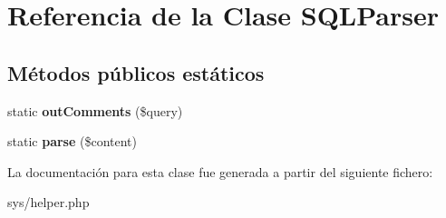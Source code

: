 \hypertarget{class_s_q_l_parser}{}\section{Referencia de la Clase S\+Q\+L\+Parser}
\label{class_s_q_l_parser}
\subsection*{Métodos públicos estáticos}
\begin{DoxyCompactItemize}
\item 
\hypertarget{class_s_q_l_parser_acb297d08abcd4ac4fabe1fbe54042e3d}{}static {\bfseries out\+Comments} (\$query)\label{class_s_q_l_parser_acb297d08abcd4ac4fabe1fbe54042e3d}

\item 
\hypertarget{class_s_q_l_parser_a6185a1ba348b3b151ba1c9a12f553508}{}static {\bfseries parse} (\$content)\label{class_s_q_l_parser_a6185a1ba348b3b151ba1c9a12f553508}

\end{DoxyCompactItemize}


La documentación para esta clase fue generada a partir del siguiente fichero\+:\begin{DoxyCompactItemize}
\item 
sys/helper.\+php\end{DoxyCompactItemize}
